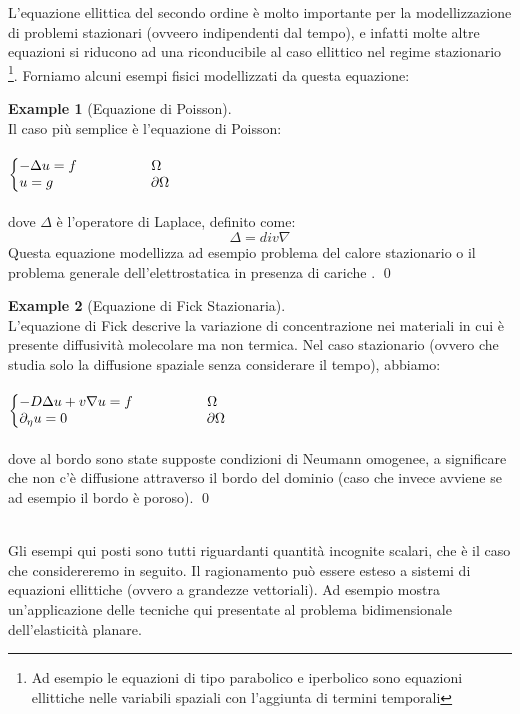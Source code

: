 \documentclass[12pt,a4paper]{report}
\makeatletter
\theoremstyle{theorem}
\theoremstyle{definition}
\newtheorem{example}{Example}
\newenvironment{system}
{\left\lbrace\begin{array}{@{}l@{}}}
{\end{array}\right.}
\makeatother
\begin{document}
L'equazione ellittica del secondo ordine è molto importante per la modellizzazione di problemi stazionari (ovveero indipendenti dal tempo), e infatti molte altre equazioni si riducono ad una riconducibile al caso ellittico nel regime stazionario \footnote{Ad esempio le equazioni di tipo parabolico e iperbolico sono equazioni ellittiche nelle variabili spaziali con l'aggiunta di termini temporali}. Forniamo alcuni esempi fisici modellizzati da questa equazione:
\begin{example} [Equazione di Poisson]
\hfill \\
Il caso più semplice è l'equazione di Poisson:\\\\
\begin{math}
\begin{system}
- \Delta u = f \qquad \qquad \quad \ \Omega \\
u = g \qquad \qquad \qquad \quad \partial \Omega \\
\end{system}
\end{math}
\hfill \\\\
dove $\Delta$ è l'operatore di Laplace, definito come:
\[ \Delta = div \nabla \]
Questa equazione modellizza ad esempio problema del calore stazionario \cite[Capitolo~3]{Salsa} o il problema generale dell'elettrostatica in presenza di cariche \cite[Capitoli~1,2,3]{Jackson}.
\qed
\end{example}
\begin{example} [Equazione di Fick Stazionaria]
\hfill \\
L'equazione di Fick descrive la variazione di concentrazione nei materiali in cui è presente diffusività molecolare ma non termica. Nel caso stazionario (ovvero che studia solo la diffusione spaziale senza considerare il tempo), abbiamo:\\\\
\begin{math}
\begin{system}
- D\Delta u + v \nabla u = f \qquad \qquad \quad \ \Omega \\
\partial_{\eta} u = 0 \quad \qquad \qquad \qquad \qquad \quad \partial \Omega \\
\end{system}
\end{math}
\hfill \\\\
dove al bordo sono state supposte condizioni di Neumann omogenee, a significare che non c'è diffusione attraverso il bordo del dominio (caso che invece avviene se ad esempio il bordo è poroso).
\qed
\end{example}
\hfill \\
Gli esempi qui posti sono tutti riguardanti quantità incognite scalari, che è il caso che considereremo in seguito. Il ragionamento può essere esteso a sistemi di equazioni ellittiche (ovvero a grandezze vettoriali). Ad esempio \cite[Capitolo~11]{BS} mostra un'applicazione delle tecniche qui presentate al problema bidimensionale dell'elasticità planare.
\end{document}
